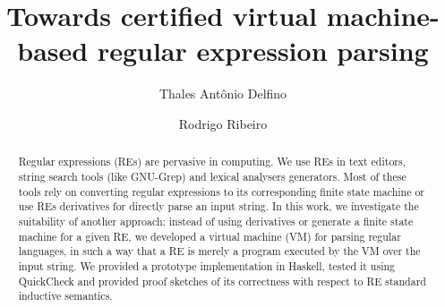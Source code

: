 \documentclass[sigplan]{acmart}
\theoremstyle{definition}
\begin{document}
\title{Towards certified virtual machine-based regular expression parsing}

\author{Thales Ant\^onio Delfino}
\author{Rodrigo Ribeiro}
\begin{abstract}
Regular expressions (REs) are pervasive in computing. We use REs in text editors, string search tools
(like GNU-Grep) and lexical analysers generators. Most of these tools rely on converting regular
expressions to its corresponding finite state machine or use REs derivatives for directly parse an
input string. In this work, we investigate the suitability of another approach: instead of
using derivatives or generate a finite state machine for a given RE, we developed a virtual machine
(VM) for parsing regular languages, in such a way that a RE is merely a program executed by the VM
over the input string. We provided a prototype implementation in Haskell, tested it using QuickCheck and
provided proof sketches of its correctness with respect to RE standard inductive semantics.
\end{abstract}
\end{document}
